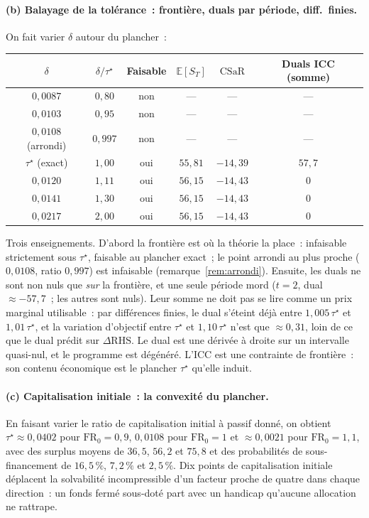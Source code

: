 \documentclass[11pt,letterpaper]{article}
\newcommand{\E}{\mathbb{E}}
\newcommand{\CSaR}{\mathrm{CSaR}}
\newcommand{\taustar}{\tau^{\star}}
\theoremstyle{definition}
\begin{document}
\paragraph{(b) Balayage de la tolérance~: frontière, duals par période, diff.\ finies.}
On fait varier $\delta$ autour du plancher~:

\begin{center}
\begin{tabular}{cccccc}
\toprule
$\delta$ & $\delta/\taustar$ & Faisable & $\E[S_T]$ & $\CSaR$ & Duals ICC (somme) \\
\midrule
$0{,}0087$ & $0{,}80$ & non & --- & --- & --- \\
$0{,}0103$ & $0{,}95$ & non & --- & --- & --- \\
$0{,}0108$ (arrondi) & $0{,}997$ & non & --- & --- & --- \\
$\taustar$ (exact) & $1{,}00$ & oui & $55{,}81$ & $-14{,}39$ & $57{,}7$ \\
$0{,}0120$ & $1{,}11$ & oui & $56{,}15$ & $-14{,}43$ & $0$ \\
$0{,}0141$ & $1{,}30$ & oui & $56{,}15$ & $-14{,}43$ & $0$ \\
$0{,}0217$ & $2{,}00$ & oui & $56{,}15$ & $-14{,}43$ & $0$ \\
\bottomrule
\end{tabular}
\end{center}

Trois enseignements. D'abord la frontière est où la théorie la place~:
infaisable strictement sous $\taustar$, faisable au plancher exact~; le point
arrondi au plus proche ($0{,}0108$, ratio $0{,}997$) est infaisable
(remarque~\ref{rem:arrondi}). Ensuite, les duals ne sont non nuls que \emph{sur} la frontière, et une seule
période mord ($t=2$, dual $\approx -57{,}7$~; les autres sont nuls). Leur
somme ne doit pas se lire comme un prix marginal utilisable~: par différences
finies, le dual s'éteint déjà entre $1{,}005\,\taustar$ et
$1{,}01\,\taustar$, et la variation d'objectif entre $\taustar$ et
$1{,}10\,\taustar$ n'est que $\approx 0{,}31$, loin de ce que le dual
prédit sur $\Delta\mathrm{RHS}$. Le dual est une dérivée à droite sur un
intervalle quasi-nul, et le programme est dégénéré. L'ICC est une contrainte de
frontière~: son contenu économique est le plancher $\taustar$ qu'elle induit.

\paragraph{(c) Capitalisation initiale~: la convexité du plancher.}
En faisant varier le ratio de capitalisation initial à passif donné, on
obtient $\taustar \approx 0{,}0402$ pour $\mathrm{FR}_0 = 0{,}9$, $0{,}0108$ pour
$\mathrm{FR}_0 = 1$ et $\approx 0{,}0021$ pour $\mathrm{FR}_0 = 1{,}1$, avec des
surplus moyens de $36{,}5$, $56{,}2$ et $75{,}8$ et des probabilités de
sous-financement de $16{,}5\,\%$, $7{,}2\,\%$ et $2{,}5\,\%$. Dix points de
capitalisation initiale déplacent la solvabilité incompressible d'un facteur
proche de quatre dans chaque direction~: un fonds fermé sous-doté part avec un
handicap qu'aucune allocation ne rattrape.
\end{document}
